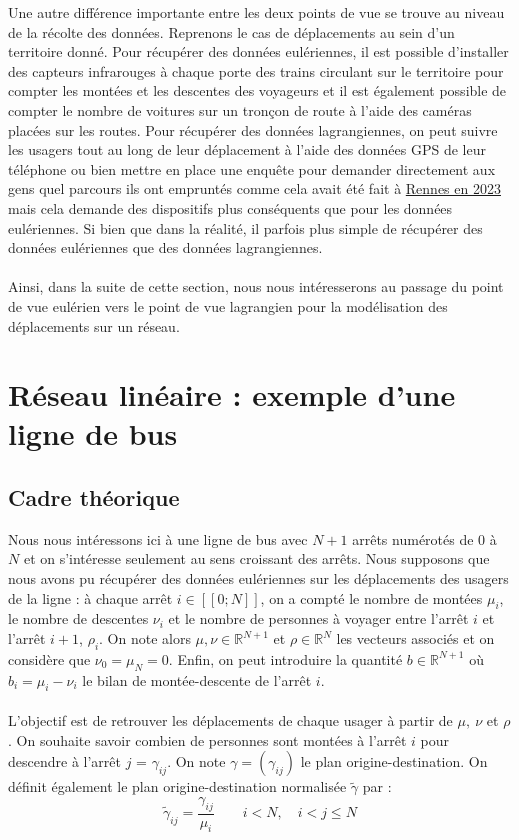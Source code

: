 \documentclass[12pt]{article}
\newcommand{\R}{\mathbb{R}}
\newcommand{\dcrochetg}{[\![}
\newcommand{\dcrochetd}{]\!]}
\begin{document}
Une autre différence importante entre les deux points de vue se trouve au niveau de la récolte des données. Reprenons le cas de déplacements au sein d'un territoire donné. Pour récupérer des données eulériennes, il est possible d'installer des capteurs infrarouges à chaque porte des trains circulant sur le territoire pour compter les montées et les descentes des voyageurs et il est également possible de compter le nombre de voitures sur un tronçon de route à l'aide des caméras placées sur les routes. Pour récupérer des données lagrangiennes, on peut suivre les usagers tout au long de leur déplacement à l'aide des données GPS de leur téléphone ou bien mettre en place une enquête pour demander directement aux gens quel parcours ils ont empruntés comme cela avait été fait à \href{https://metropole.rennes.fr/une-enquete-sur-les-deplacements-dans-le-reseau-star}{Rennes en 2023} mais cela demande des dispositifs plus conséquents que pour les données eulériennes. Si bien que dans la réalité, il parfois plus simple de récupérer des données eulériennes que des données lagrangiennes.\\
\\
Ainsi, dans la suite de cette section, nous nous intéresserons au passage du point de vue eulérien vers le point de vue lagrangien pour la modélisation des déplacements sur un réseau.
\section{Réseau linéaire : exemple d'une ligne de bus}
\subsection{Cadre théorique}
Nous nous intéressons ici à une ligne de bus avec $N+1$ arrêts numérotés de 0 à $N$ et on s'intéresse seulement au sens croissant des arrêts. Nous supposons que nous avons pu récupérer des données eulériennes sur les déplacements des usagers de la ligne : à chaque arrêt $i \in \dcrochetg 0;N\dcrochetd$, on a compté le nombre de montées $\mu_i$, le nombre de descentes $\nu_i$ et le nombre de personnes à voyager entre l'arrêt $i$ et l'arrêt $i+1$, $\rho_i$. On note alors $\mu, \nu \in \R^{N+1}$ et $\rho \in \R^N$ les vecteurs associés et on considère que $\nu_0 = \mu_N = 0$. Enfin, on peut introduire la quantité $b \in \R^{N+1}$ où $b_i = \mu_i - \nu_i$ le bilan de montée-descente de l'arrêt $i$.\\
\\
L'objectif est de retrouver les déplacements de chaque usager à partir de $\mu,\: \nu$ et $\rho$. On souhaite savoir combien de personnes sont montées à l'arrêt $i$ pour descendre à l'arrêt $j$ = $\gamma_{ij}$. On note $\gamma = (\gamma_{ij})$ le plan origine-destination. On définit également le plan origine-destination normalisée $\tilde{\gamma}$ par : \[\tilde{\gamma}_{ij} = \frac{\gamma_{ij}}{\mu_i} \qquad i < N,\quad i<j\leq N\] 
\end{document}
